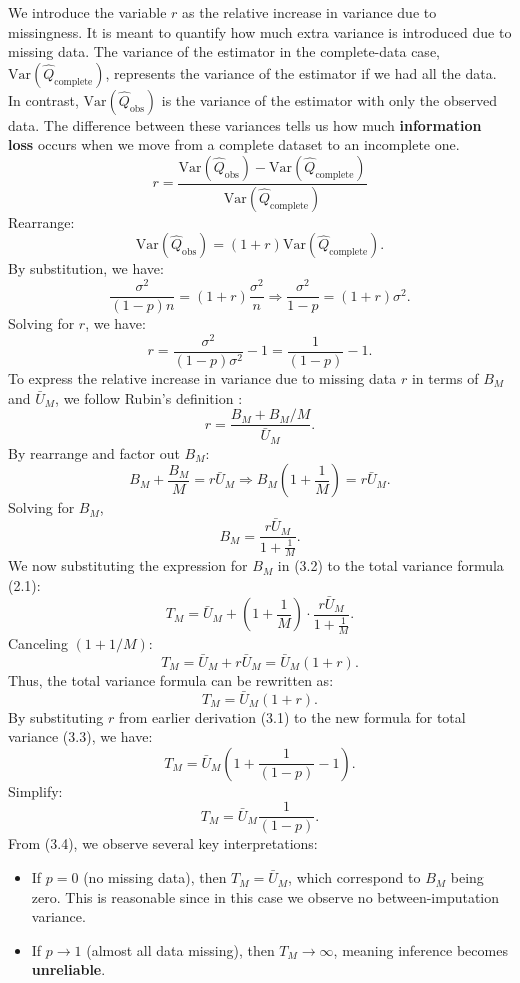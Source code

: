 \documentclass[12pt,oneside]{amsart}
\theoremstyle{definition}
\theoremstyle{remark}
\numberwithin{equation}{section}
\begin{document}
We introduce the variable $r$ as the relative increase in variance due to missingness. It is meant to quantify how much extra variance is introduced due to missing data. The variance of the estimator in the complete-data case, $\text{Var}(\hat{Q}_{\text{complete}})$, represents the variance of the estimator if we had all the data. In contrast, $\text{Var}(\hat{Q}_{\text{obs}})$ is the variance of the estimator with only the observed data. The difference between these variances tells us how much \textbf{information loss} occurs when we move from a complete dataset to an incomplete one.
\[
    r = \frac{\text{Var}(\hat{Q}_{\text{obs}}) - \text{Var}(\hat{Q}_{\text{complete}})}{\text{Var}(\hat{Q}_{\text{complete}})}
\]
Rearrange:
\[
\text{Var}(\hat{Q}_{\text{obs}}) = (1 + r) \text{Var}(\hat{Q}_{\text{complete}}).
\]
By substitution, we have:
\[
    \frac{\sigma^2}{(1 - p)n} = (1 + r) \frac{\sigma^2}{n} \Longrightarrow \frac{\sigma^2}{1 - p} = (1 + r) \sigma^2.
\]
Solving for $r$, we have:
\begin{equation}
r = \frac{\sigma^2}{(1 - p)\sigma^2} - 1 = \frac{1}{(1 - p)} - 1.
\end{equation}
To express the relative increase in variance due to missing data $r$ in terms of $B_M$ and $\bar{U}_M$, we follow Rubin's definition \citep{rubin}:
\[
r = \frac{B_M + B_M/M}{\bar{U}_M}.
\]
By rearrange and factor out $B_M$:
\[
B_M + \frac{B_M}{M} = r \bar{U}_M \Longrightarrow B_M \left(1 + \frac{1}{M}\right) = r \bar{U}_M.
\]
Solving for $B_M$, 
\begin{equation}
    B_M = \frac{r \bar{U}_M}{1 + \frac{1}{M}}.
\end{equation}
We now substituting the expression for $B_M$ in (3.2) to the total variance formula (2.1):
\[
T_M = \bar{U}_M + \left(1 + \frac{1}{M}\right) \cdot \frac{r \bar{U}_M}{1 + \frac{1}{M}}.
\]
Canceling $(1 + 1/M)$:
\[
T_M = \bar{U}_M + r \bar{U}_M = \bar{U}_M (1 + r).
\]
Thus, the total variance formula can be rewritten as:
\begin{equation}
    T_M = \bar{U}_M (1 + r).
\end{equation}
By substituting $r$ from earlier derivation (3.1) to the new formula for total variance (3.3), we have:
\[
T_M = \bar{U}_M \left(1 + \frac{1}{(1 - p)} - 1 \right).
\]
Simplify:
\begin{equation}
    T_M = \bar{U}_M \frac{1}{(1 - p)}.
\end{equation}
From (3.4), we observe several key interpretations:
\begin{itemize}
    \item If $p = 0$ (no missing data), then $T_M = \bar{U}_M$, which correspond to $B_M$ being zero. This is reasonable since in this case we observe no between-imputation variance. 
    \item If $p \to 1$ (almost all data missing), then $T_M \to \infty$, meaning inference becomes \textbf{unreliable}.
\end{itemize}
\end{document}
